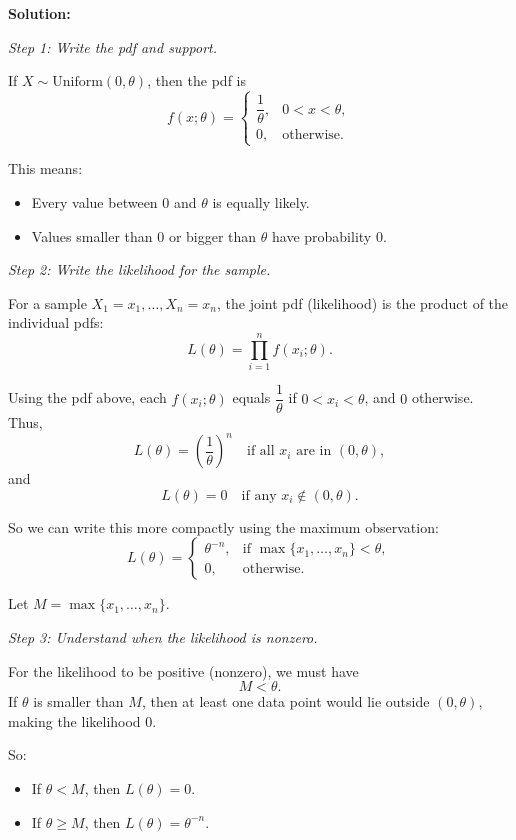 \documentclass[11pt,letterpaper]{article}
\theoremstyle{remark}
\begin{document}
\vspace{1cm}

\textbf{Solution:}

\textit{Step 1: Write the pdf and support.}

If $X \sim \mathrm{Uniform}(0,\theta)$, then the pdf is
\[
f(x;\theta) =
\begin{cases}
\dfrac{1}{\theta}, & 0 < x < \theta, \\[4pt]
0, & \text{otherwise.}
\end{cases}
\]

This means:
\begin{itemize}
    \item Every value between $0$ and $\theta$ is equally likely.
    \item Values smaller than $0$ or bigger than $\theta$ have probability $0$.
\end{itemize}

\textit{Step 2: Write the likelihood for the sample.}

For a sample $X_1 = x_1, \ldots, X_n = x_n$, the joint pdf (likelihood) is the product of the individual pdfs:
\[
L(\theta)
= \prod_{i=1}^n f(x_i;\theta).
\]

Using the pdf above, each $f(x_i;\theta)$ equals $\dfrac{1}{\theta}$ if $0 < x_i < \theta$, and $0$ otherwise. Thus,
\[
L(\theta)
= \left(\frac{1}{\theta}\right)^n
\quad \text{if all } x_i \text{ are in } (0,\theta),
\]
and
\[
L(\theta) = 0 \quad \text{if any } x_i \notin (0,\theta).
\]

So we can write this more compactly using the maximum observation:
\[
L(\theta) =
\begin{cases}
\theta^{-n}, & \text{if } \max\{x_1,\dots,x_n\} < \theta, \\[4pt]
0, & \text{otherwise.}
\end{cases}
\]

Let $M = \max\{x_1, \dots, x_n\}$.

\textit{Step 3: Understand when the likelihood is nonzero.}

For the likelihood to be positive (nonzero), we must have
\[
M < \theta.
\]
If $\theta$ is smaller than $M$, then at least one data point would lie outside $(0,\theta)$, making the likelihood $0$.

So:
\begin{itemize}
    \item If $\theta < M$, then $L(\theta) = 0$.
    \item If $\theta \ge M$, then $L(\theta) = \theta^{-n}$.
\end{itemize}
\end{document}
